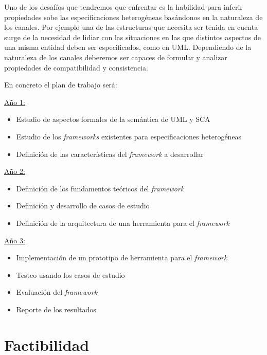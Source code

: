 \documentclass[a4paper, 11pt]{article}
\begin{document}
Uno de los desafíos que tendremos que enfrentar es la habilidad para inferir propiedades sobe las especificaciones heterogéneas basándonos en la naturaleza de los canales. Por ejemplo una de las estructuras que necesita ser tenida en cuenta surge de la necesidad de lidiar con las situaciones en las que distintos aspectos de una misma entidad deben ser especificados, como en UML. Dependiendo de la naturaleza de los canales deberemos ser capaces de formular y analizar propiedades de compatibilidad y consistencia.

\noindent En concreto el plan de trabajo será:

\begin{multicols}{3}

 \underline{Año 1:}
 \begin{itemize}
  \item Estudio de aspectos formales de la semántica de UML y SCA
  \item Estudio de los \emph{frameworks} existentes para especificaciones heterogéneas
  \item Definición de las características del \emph{framework} a desarrollar
 \end{itemize}

 \underline{Año 2:}
 \begin{itemize}
  \item Definición de los fundamentos teóricos del \emph{framework}
  \item Definición y desarrollo de casos de estudio
  \item Definición de la arquitectura de una herramienta para el \emph{framework}
 \end{itemize}
 
 \underline{Año 3:}
 \begin{itemize}
  \item Implementación de un prototipo de herramienta para el \emph{framework}
  \item Testeo usando los casos de estudio
  \item Evaluación del \emph{framework}
  \item Reporte de los resultados
 \end{itemize}
 
\end{multicols}

\section{Factibilidad}
\end{document}
